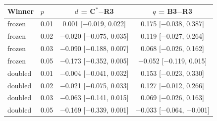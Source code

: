 \begin{tabular}{llcc}
\toprule
Winner & $p$ & $d$ = C$^*$$-$R3 & $q$ = B3$-$R3 \\
\midrule
frozen & 0.01 & 0.001 [$-$0.019, 0.022] & 0.175 [$-$0.038, 0.387] \\
frozen & 0.02 & $-$0.020 [$-$0.075, 0.035] & 0.119 [$-$0.027, 0.264] \\
frozen & 0.03 & $-$0.090 [$-$0.188, 0.007] & 0.068 [$-$0.026, 0.162] \\
frozen & 0.05 & $-$0.173 [$-$0.352, 0.005] & $-$0.052 [$-$0.119, 0.015] \\
doubled & 0.01 & $-$0.004 [$-$0.041, 0.032] & 0.153 [$-$0.023, 0.330] \\
doubled & 0.02 & $-$0.021 [$-$0.075, 0.033] & 0.127 [$-$0.012, 0.266] \\
doubled & 0.03 & $-$0.063 [$-$0.141, 0.015] & 0.069 [$-$0.026, 0.163] \\
doubled & 0.05 & $-$0.169 [$-$0.339, 0.001] & $-$0.033 [$-$0.064, $-$0.001] \\
\bottomrule
\end{tabular}
